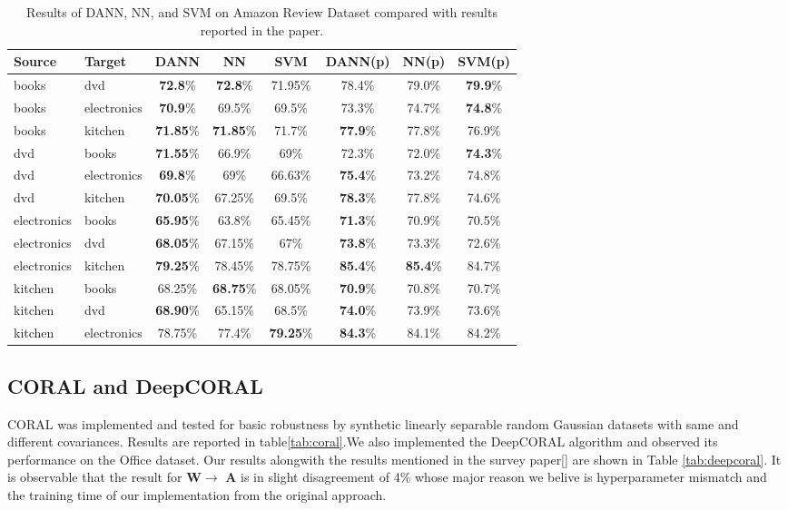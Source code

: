 \documentclass{article}
\begin{document}
\begin{table}[t]
  \centering
  \caption{Results of DANN, NN, and SVM on Amazon Review Dataset compared with results reported in the paper.}
  \label{tab:DANN_Sentiment}
  \begin{tabular}{llcccccc}
    \toprule
    Source & Target & DANN & NN & SVM & DANN(p) & NN(p) & SVM(p) \\
    \midrule
    books & dvd         & \textbf{72.8}\% & \textbf{72.8}\% & 71.95\% & 78.4\% & 79.0\% & \textbf{79.9}\% \\
    books & electronics & \textbf{70.9}\% & 69.5\% & 69.5\% & 73.3\% & 74.7\% & \textbf{74.8}\% \\
    books & kitchen     & \textbf{71.85}\% & \textbf{71.85}\% & 71.7\% & \textbf{77.9}\% & 77.8\% & 76.9\% \\
    dvd   & books       & \textbf{71.55}\% & 66.9\% & 69\% & 72.3\% & 72.0\% & \textbf{74.3}\% \\
    dvd   & electronics & \textbf{69.8}\% & 69\% & 66.63\% & \textbf{75.4}\% & 73.2\% & 74.8\% \\
    dvd   & kitchen     & \textbf{70.05}\% & 67.25\% & 69.5\% & \textbf{78.3}\% & 77.8\% & 74.6\% \\
    electronics & books       & \textbf{65.95}\% & 63.8\% & 65.45\% & \textbf{71.3}\% & 70.9\% & 70.5\% \\
    electronics & dvd         & \textbf{68.05}\% & 67.15\% & 67\% & \textbf{73.8}\% & 73.3\% & 72.6\% \\
    electronics & kitchen     & \textbf{79.25}\% & 78.45\% & 78.75\% & \textbf{85.4}\% & \textbf{85.4}\% & 84.7\% \\
    kitchen & books       & 68.25\% & \textbf{68.75}\% & 68.05\% & \textbf{70.9}\% & 70.8\% & 70.7\% \\
    kitchen & dvd         & \textbf{68.90}\% & 65.15\% & 68.5\% & \textbf{74.0}\% & 73.9\% & 73.6\% \\
    kitchen & electronics & 78.75\% & 77.4\% & \textbf{79.25}\% & \textbf{84.3}\% & 84.1\% & 84.2\% \\
    \bottomrule
  \end{tabular}
\end{table}

\subsection{CORAL and DeepCORAL}

CORAL\cite{Coral} was implemented and tested for basic robustness by synthetic linearly separable random Gaussian datasets with same and different covariances. Results are reported in table\ref{tab:coral}.We also implemented the DeepCORAL\cite{DeepCoral} algorithm and observed its performance on the Office dataset. Our results alongwith the results mentioned in the survey paper[\cite{DeepCoral}] are shown in Table \ref{tab:deepcoral}. It is observable that the result for \textbf{W}$\rightarrow$ \textbf{A} is in slight disagreement of 4\% whose major reason we belive is hyperparameter mismatch and the training time of our implementation from the original approach.
\end{document}
